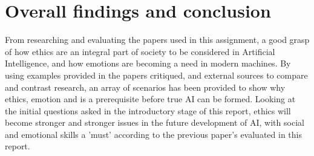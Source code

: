 \documentclass[article]{IEEEtran}
\begin{document}
\section{Overall findings and conclusion}
From researching and evaluating the papers used in this assignment, a good grasp of how ethics are an integral part of society to be considered in Artificial Intelligence, and how emotions are becoming a need in modern machines. By using examples provided in the papers critiqued, and external sources to compare and contrast research, an array of scenarios has been provided to show why ethics, emotion and  is a prerequisite before true AI can be formed.
Looking at the initial questions asked in the introductory stage of this report, ethics will become stronger and stronger issues in the future development of AI, with social and emotional skills a 'must' according to the previous paper's evaluated in this report.
\end{document}
